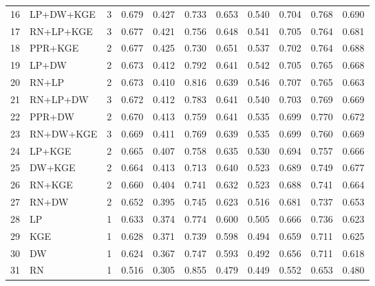 \begin{table}[H]
\begin{tabular}{rlccrrrrrrr}
16 & LP+DW+KGE & 3 & 0.679 & 0.427 & 0.733 & 0.653 & 0.540 & 0.704 & 0.768 & 0.690 \\
17 & RN+LP+KGE & 3 & 0.677 & 0.421 & 0.756 & 0.648 & 0.541 & 0.705 & 0.764 & 0.681 \\
18 & PPR+KGE & 2 & 0.677 & 0.425 & 0.730 & 0.651 & 0.537 & 0.702 & 0.764 & 0.688 \\
19 & LP+DW & 2 & 0.673 & 0.412 & 0.792 & 0.641 & 0.542 & 0.705 & 0.765 & 0.668 \\
20 & RN+LP & 2 & 0.673 & 0.410 & 0.816 & 0.639 & 0.546 & 0.707 & 0.765 & 0.663 \\
21 & RN+LP+DW & 3 & 0.672 & 0.412 & 0.783 & 0.641 & 0.540 & 0.703 & 0.769 & 0.669 \\
22 & PPR+DW & 2 & 0.670 & 0.413 & 0.759 & 0.641 & 0.535 & 0.699 & 0.770 & 0.672 \\
23 & RN+DW+KGE & 3 & 0.669 & 0.411 & 0.769 & 0.639 & 0.535 & 0.699 & 0.760 & 0.669 \\
24 & LP+KGE & 2 & 0.665 & 0.407 & 0.758 & 0.635 & 0.530 & 0.694 & 0.757 & 0.666 \\
25 & DW+KGE & 2 & 0.664 & 0.413 & 0.713 & 0.640 & 0.523 & 0.689 & 0.749 & 0.677 \\
26 & RN+KGE & 2 & 0.660 & 0.404 & 0.741 & 0.632 & 0.523 & 0.688 & 0.741 & 0.664 \\
27 & RN+DW & 2 & 0.652 & 0.395 & 0.745 & 0.623 & 0.516 & 0.681 & 0.737 & 0.653 \\
28 & LP & 1 & 0.633 & 0.374 & 0.774 & 0.600 & 0.505 & 0.666 & 0.736 & 0.623 \\
29 & KGE & 1 & 0.628 & 0.371 & 0.739 & 0.598 & 0.494 & 0.659 & 0.711 & 0.625 \\
30 & DW & 1 & 0.624 & 0.367 & 0.747 & 0.593 & 0.492 & 0.656 & 0.711 & 0.618 \\
31 & RN & 1 & 0.516 & 0.305 & 0.855 & 0.479 & 0.449 & 0.552 & 0.653 & 0.480 \\
\bottomrule
\end{tabular}
\end{table}